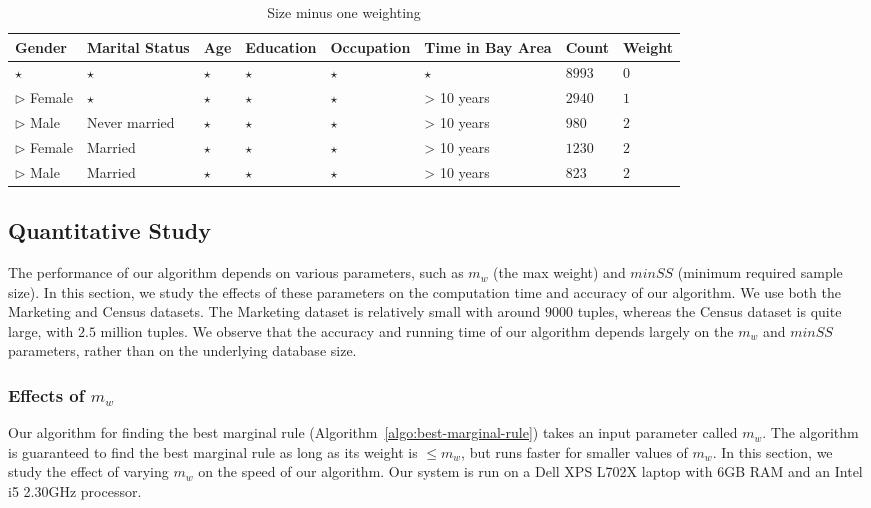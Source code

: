 \begin{table} 
\centering 
\begin{tabular}{| p{1.5cm} | p{1.5cm} | p{1.5cm} | p{1.5cm} | p{1.5cm} | p{1.5cm} | l | l |} 
\hline Gender & Marital Status & Age & Education & Occupation & Time in Bay Area & Count & Weight \\ \hline 
\cline{1-8} $\star$ & $\star$ & $\star$ & $\star$ & $\star$ & $\star$ & $8993$ & $0$ \\
\cline{1-1} \cline{2-2} \cline{3-3} \cline{4-4} \cline{5-5} \cline{6-6} \cline{7-8} $\triangleright$ Female & $\star$ & $\star$ & $\star$ & $\star$ & > 10 years & $2940$ & $1$ \\
\cline{1-1} \cline{2-2} \cline{3-3} \cline{4-4} \cline{5-5} \cline{6-6} \cline{7-8} $\triangleright$ Male & Never married & $\star$ & $\star$ & $\star$ & > 10 years & $980$ & $2$ \\
\cline{1-1} \cline{2-2} \cline{3-3} \cline{4-4} \cline{5-5} \cline{6-6} \cline{7-8} $\triangleright$ Female & Married & $\star$ & $\star$ & $\star$ & > 10 years & $1230$ & $2$ \\
\cline{1-1} \cline{2-2} \cline{3-3} \cline{4-4} \cline{5-5} \cline{6-6} \cline{7-8} $\triangleright$ Male & Married & $\star$ & $\star$ & $\star$ & > 10 years & $823$ & $2$ \\
\hline 
\end{tabular} 
\caption{Size minus one weighting \label{table:weightingsizeminusone}} 
\end{table}  


\subsection{Quantitative Study}\label{sec:quantitative_study}
The performance of our algorithm depends on various parameters, such as $m_w$ (the max weight) and $minSS$ (minimum required sample size). In this section, we study the effects of these parameters on the computation time and accuracy of our algorithm. We use both the Marketing and Census datasets. The Marketing dataset is relatively small with around $9000$ tuples, whereas the Census dataset is quite large, with $2.5$ million tuples. We observe that the accuracy and running time of our algorithm depends largely on the $m_w$ and $minSS$ parameters, rather than on the underlying database size.

\subsubsection{Effects of $m_w$}
Our algorithm for finding the best marginal rule (Algorithm~\ref{algo:best-marginal-rule}) takes an input parameter called $m_w$. The algorithm is guaranteed to find the best marginal rule as long as its weight is $\leq m_w$, but runs faster for smaller values of $m_w$. In this section, we study the effect of varying $m_w$ on the speed of our algorithm. Our system is run on a Dell XPS L702X laptop with 6GB RAM and an Intel i5 2.30GHz processor.

